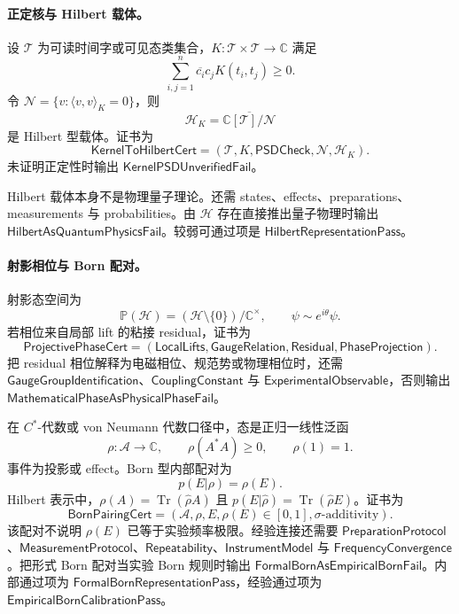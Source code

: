 \paragraph{正定核与 Hilbert 载体。}
设 \(\mathcal T\) 为可读时间字或可见态类集合，\(K:\mathcal T\times\mathcal T\to\mathbb C\) 满足
\[
\sum_{i,j=1}^n\overline{c_i}c_jK(t_i,t_j)\ge0.
\]
令 \(\mathcal N=\{v:\langle v,v\rangle_K=0\}\)，则
\[
\boxed{\mathcal H_K=\overline{\mathbb C[\mathcal T]/\mathcal N}}
\]
是 Hilbert 型载体。证书为
\[
\boxed{\mathsf{KernelToHilbertCert}=(\mathcal T,K,\mathsf{PSDCheck},\mathcal N,\mathcal H_K).}
\]
未证明正定性时输出 \(\mathsf{KernelPSDUnverifiedFail}\)。

Hilbert 载体本身不是物理量子理论。还需 states、effects、preparations、measurements 与 probabilities。由 \(\mathcal H\) 存在直接推出量子物理时输出 \(\mathsf{HilbertAsQuantumPhysicsFail}\)。较弱可通过项是 \(\mathsf{HilbertRepresentationPass}\)。

\paragraph{射影相位与 Born 配对。}
射影态空间为
\[
\mathbb P(\mathcal H)=(\mathcal H\setminus\{0\})/\mathbb C^\times,\qquad \psi\sim e^{i\theta}\psi.
\]
若相位来自局部 lift 的粘接 residual，证书为
\[
\boxed{\mathsf{ProjectivePhaseCert}=(\mathsf{LocalLifts},\mathsf{GaugeRelation},\mathsf{Residual},\mathsf{PhaseProjection}).}
\]
把 residual 相位解释为电磁相位、规范势或物理相位时，还需 \(\mathsf{GaugeGroupIdentification}\)、\(\mathsf{CouplingConstant}\) 与 \(\mathsf{ExperimentalObservable}\)，否则输出 \(\mathsf{MathematicalPhaseAsPhysicalPhaseFail}\)。

在 \(C^*\)-代数或 von Neumann 代数口径中，态是正归一线性泛函
\[
\rho:\mathcal A\to\mathbb C,\qquad \rho(A^*A)\ge0,\qquad \rho(1)=1.
\]
事件为投影或 effect。Born 型内部配对为
\[
\boxed{p(E|\rho)=\rho(E).}
\]
Hilbert 表示中，\(\rho(A)=\operatorname{Tr}(\hat\rho A)\) 且 \(p(E|\hat\rho)=\operatorname{Tr}(\hat\rho E)\)。证书为
\[
\boxed{\mathsf{BornPairingCert}=(\mathcal A,\rho,E,\rho(E)\in[0,1],\sigma\text{-additivity}).}
\]
该配对不说明 \(\rho(E)\) 已等于实验频率极限。经验连接还需要 \(\mathsf{PreparationProtocol}\)、\(\mathsf{MeasurementProtocol}\)、\(\mathsf{Repeatability}\)、\(\mathsf{InstrumentModel}\) 与 \(\mathsf{FrequencyConvergence}\)。把形式 Born 配对当实验 Born 规则时输出 \(\mathsf{FormalBornAsEmpiricalBornFail}\)。内部通过项为 \(\mathsf{FormalBornRepresentationPass}\)，经验通过项为 \(\mathsf{EmpiricalBornCalibrationPass}\)。

